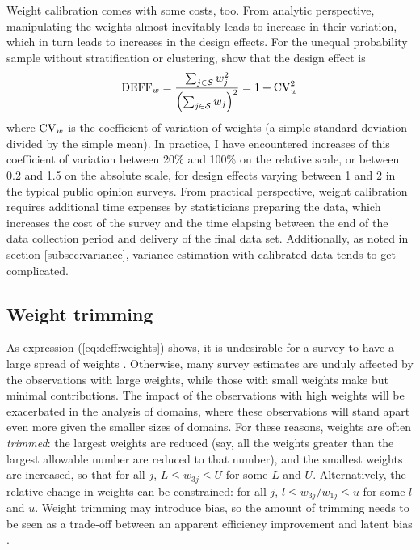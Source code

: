 Weight calibration comes with some costs, too. From analytic perspective,
manipulating the weights almost inevitably leads to increase in their
variation, which in turn leads to increases in the design effects.
For the unequal probability sample without stratification or clustering,
\citet{korn:graubard:1999} show that the design effect is
\begin{equation}
    {\rm DEFF}_w = \frac{\sum_{j \in \mathcal{S}} w_j^2 }%
       {\Bigl(\sum_{j \in \mathcal{S}} w_j\Bigr)^2}
    = 1 + {\rm CV}_w^2
    \label{eq:deff:weights}
\end{equation}
where ${\rm CV}_w$ is the coefficient of variation of weights
(a simple standard deviation divided by the simple mean).
In practice, I have encountered increases of this coefficient
of variation between 20\% and 100\% on the relative scale,
or between 0.2 and 1.5 on the absolute scale, for design effects
varying between 1 and 2 in the typical public opinion surveys.
From practical perspective, weight calibration requires
additional time expenses by statisticians preparing the data,
which increases the cost of the survey and the time elapsing
between the end of the data collection period and delivery
of the final data set. Additionally, as noted in section
\ref{subsec:variance}, variance estimation with calibrated
data tends to get complicated.

\subsection{Weight trimming}
\label{subsec:trimming}

As expression (\ref{eq:deff:weights}) shows, it is undesirable
for a survey to have a large spread of weights \citep{theberge:2000}.
Otherwise, many survey
estimates are unduly affected by the observations with large weights,
while those with small weights make but minimal contributions.
The impact of the observations with high weights will be exacerbated
in the analysis of domains, where these observations will stand apart
even more given the smaller sizes of domains.
For these reasons, weights are often {\it trimmed}: the largest
weights are reduced (say, all the weights greater than the largest allowable
number are reduced to that number), and the smallest weights are increased,
so that for all $j$, $L \le w_{3j} \le U$ for some $L$ and $U$.
Alternatively, the relative change in weights can be constrained:
for all $j$, $l \le w_{3j}/w_{1j} \le u$ for some $l$ and $u$.
Weight trimming may introduce bias, so the amount of trimming needs to be
seen as a trade-off between an apparent efficiency improvement
and latent bias \citep{elliott:2008}.


